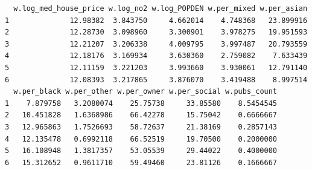 \documentclass[
  letterpaper,
  DIV=11,
  numbers=noendperiod]{scrreprt}
\newenvironment{Shaded}{\begin{snugshade}}{\end{snugshade}}
\newcommand{\AttributeTok}[1]{\textcolor[rgb]{0.40,0.45,0.13}{#1}}
\newcommand{\CommentTok}[1]{\textcolor[rgb]{0.37,0.37,0.37}{#1}}
\newcommand{\ControlFlowTok}[1]{\textcolor[rgb]{0.00,0.23,0.31}{#1}}
\newcommand{\FunctionTok}[1]{\textcolor[rgb]{0.28,0.35,0.67}{#1}}
\newcommand{\NormalTok}[1]{\textcolor[rgb]{0.00,0.23,0.31}{#1}}
\newcommand{\OtherTok}[1]{\textcolor[rgb]{0.00,0.23,0.31}{#1}}
\newcommand{\SpecialCharTok}[1]{\textcolor[rgb]{0.37,0.37,0.37}{#1}}
\newcommand{\StringTok}[1]{\textcolor[rgb]{0.13,0.47,0.30}{#1}}
\begin{document}
\begin{Shaded}
\end{Shaded}

\begin{verbatim}
  w.log_med_house_price w.log_no2 w.log_POPDEN w.per_mixed w.per_asian
1              12.98382  3.843750     4.662014    4.748368   23.899916
2              12.28730  3.098960     3.300901    3.978275   19.951593
3              12.21207  3.206338     4.009795    3.997487   20.793559
4              12.18176  3.169934     3.630360    2.759082    7.633439
5              12.11159  3.221203     3.993660    3.930061   12.791140
6              12.08393  3.217865     3.876070    3.419488    8.997514
  w.per_black w.per_other w.per_owner w.per_social w.pubs_count
1    7.879758   3.2080074    25.75738     33.85580    8.5454545
2   10.451828   1.6368986    66.42278     15.75042    0.6666667
3   12.965863   1.7526693    58.72637     21.38169    0.2857143
4   12.135478   0.6992118    66.52519     19.70500    0.2000000
5   16.108948   1.3817357    53.05539     29.44022    0.4000000
6   15.312652   0.9611710    59.49460     23.81126    0.1666667
\end{verbatim}
\end{document}
